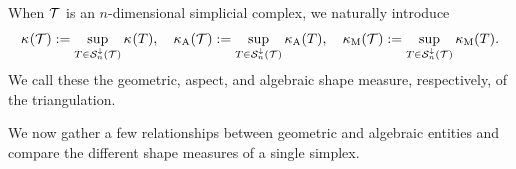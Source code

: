\documentclass[10pt,letterpaper]{article}
\begin{document}
When ${\mathcal T}$ is an $n$-dimensional simplicial complex, we naturally introduce 
\begin{align}\label{math:shapemeasure:triangulation}
    \kappa_{}({\mathcal T}) := \sup_{ T \in {\mathcal S}^{\downarrow}_{n}({\mathcal T}) } \kappa_{}(T)
    ,
    \quad 
    \kappa_{\rm A}({\mathcal T}) := \sup_{ T \in {\mathcal S}^{\downarrow}_{n}({\mathcal T}) } \kappa_{\rm A}(T)
    ,
    \quad 
    \kappa_{\rm M}({\mathcal T}) := \sup_{ T \in {\mathcal S}^{\downarrow}_{n}({\mathcal T}) } \kappa_{\rm M}(T)
    .
\end{align}
We call these the geometric, aspect, and algebraic shape measure, respectively, of the triangulation. 

We now gather a few relationships between geometric and algebraic entities and compare the different shape measures of a single simplex.
\end{document}
